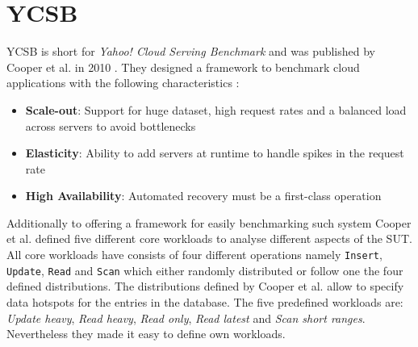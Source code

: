 \section{YCSB}
\label{sec:ycsb}
YCSB is short for \emph{Yahoo! Cloud Serving Benchmark} and was published by Cooper et al. in 2010 \cite{ycsb.2010}. They designed a framework to benchmark cloud applications with the following characteristics \cite[2]{ycsb.2010}:

\begin{itemize}
  \item \textbf{Scale-out}: Support for huge dataset, high request rates and a balanced load across servers to avoid bottlenecks
  \item \textbf{Elasticity}: Ability to add servers at runtime to handle spikes in the request rate
  \item \textbf{High Availability}: Automated recovery must be a first-class operation
\end{itemize}

Additionally to offering a framework for easily benchmarking such system Cooper et al. defined five different core workloads to analyse different aspects of the \ac{SUT}. All core workloads have consists of four different operations namely \texttt{Insert}, \texttt{Update}, \texttt{Read} and \texttt{Scan} which either randomly distributed or follow one the four defined distributions. The distributions defined by Cooper et al. allow to specify data hotspots for the entries in the database. The five predefined workloads are: \emph{Update heavy}, \emph{Read heavy}, \emph{Read only}, \emph{Read latest} and \emph{Scan short ranges}. Nevertheless they made it easy to define own workloads. \cite[4 - 6]{ycsb.2010}